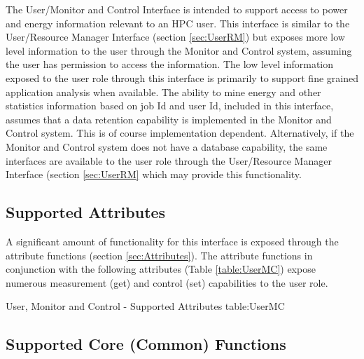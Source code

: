 The User/Monitor and Control Interface is intended to support access to power and energy information relevant to an HPC user. 
This interface is similar to the User/Resource Manager Interface  (section \ref{sec:UserRM}) but exposes more low level information to the user through the Monitor and Control system, assuming the user has permission to access the information.
The low level information exposed to the user role through this interface is primarily to support fine grained application analysis when available.
The ability to mine energy and other statistics information based on job Id and user Id, included in this interface, assumes that a data retention capability is implemented in the Monitor and Control system.
This is of course implementation dependent.
Alternatively, if the Monitor and Control system does not have a database capability, the same interfaces are available to the user role through the User/Resource Manager Interface (section \ref{sec:UserRM} which may  provide this functionality.



\subsection{Supported Attributes}\label{sec:UserMCAttributes}
A significant amount of functionality for this interface is exposed through the attribute functions (section \ref{sec:Attributes}).
The attribute functions in conjunction with the following attributes (Table \ref{table:UserMC}) expose numerous measurement  (get) and control (set) capabilities to the user role.

\begin{attributetable}{User, Monitor and Control - Supported Attributes }{table:UserMC}
	\aPstateDesc
	\aCstateDesc
	\aSstateDesc
	\aCurrentDesc
	\aVoltageDesc
	\aPowerDesc
	\aMinPowerDesc
	\aMaxPowerDesc
	\aFreqDesc
	\aFreqLimitMinDesc
	\aFreqLimitMaxDesc
	\aEnergyDesc
	\aTempDesc
\end{attributetable}

\subsection{Supported Core (Common) Functions}\label{sec:UserMCSupportedCommon}

